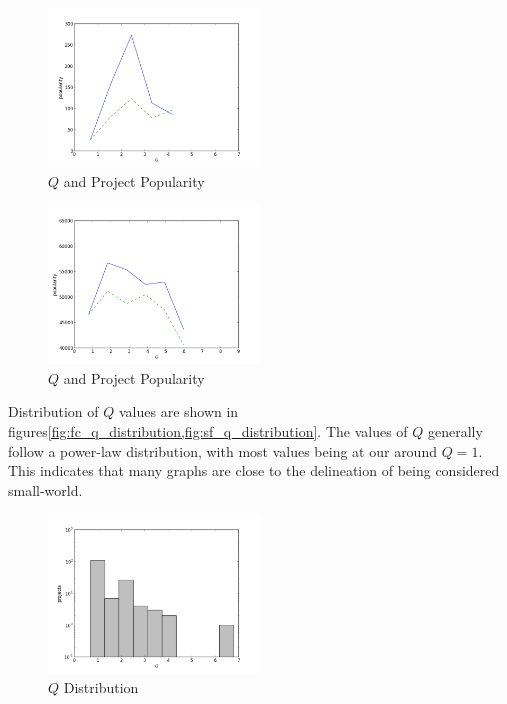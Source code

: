 \documentclass{proc}
\begin{document}
\begin{figure}
\begin{center}
\includegraphics[width=0.5\textwidth]{images/freecode-graph.png}
\end{center}
\caption{$Q$ and Project Popularity}
\label{fig:q_fc_graph}
\end{figure}


\begin{figure}
\begin{center}
\includegraphics[width=0.5\textwidth]{images/sf-graph.png}
\end{center}
\caption{$Q$ and Project Popularity}
\label{fig:q_sf_graph}
\end{figure}

Distribution of $Q$ values are shown in figures\ref{fig:fc_q_distribution,fig:sf_q_distribution}. The values of $Q$ generally follow a power-law distribution, with most values being at our around $Q = 1$. This indicates that many graphs are close to the delineation of being considered small-world\cite{humphries2008network}.


\begin{figure}
\begin{center}
\includegraphics[width=0.5\textwidth]{images/freecode-q-histo.png}
\end{center}
\caption{$Q$ Distribution}
\label{fig:q_fc_distribution}
\end{figure}
\end{document}
